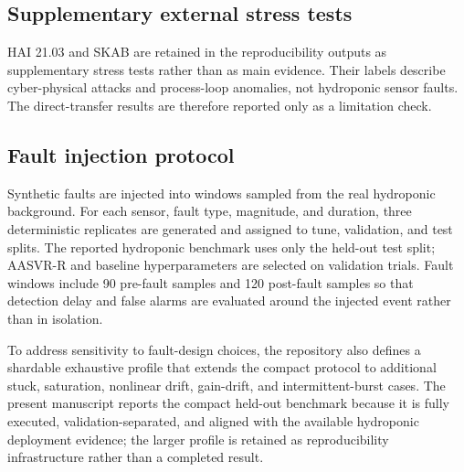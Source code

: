 \documentclass[preprint,12pt,doubleblind]{elsarticle}
\begin{document}
\subsection{Supplementary external stress tests}
HAI 21.03 and SKAB are retained in the reproducibility outputs as supplementary stress tests rather than as main evidence. Their labels describe cyber-physical attacks and process-loop anomalies, not hydroponic sensor faults. The direct-transfer results are therefore reported only as a limitation check.

\subsection{Fault injection protocol}
\label{sec:fault_protocol}
Synthetic faults are injected into windows sampled from the real hydroponic background. For each sensor, fault type, magnitude, and duration, three deterministic replicates are generated and assigned to tune, validation, and test splits. The reported hydroponic benchmark uses only the held-out test split; AASVR-R and baseline hyperparameters are selected on validation trials. Fault windows include 90 pre-fault samples and 120 post-fault samples so that detection delay and false alarms are evaluated around the injected event rather than in isolation.

To address sensitivity to fault-design choices, the repository also defines a shardable exhaustive profile that extends the compact protocol to additional stuck, saturation, nonlinear drift, gain-drift, and intermittent-burst cases. The present manuscript reports the compact held-out benchmark because it is fully executed, validation-separated, and aligned with the available hydroponic deployment evidence; the larger profile is retained as reproducibility infrastructure rather than a completed result.
\end{document}
